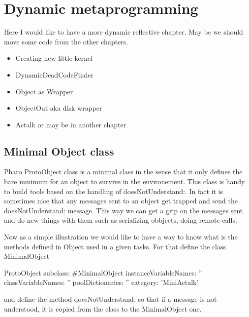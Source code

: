 \documentclass[a4paper,10pt,twoside]{book}
\begin{document}
	\sloppy
\fi
\chapter{Dynamic metaprogramming}\label{cha:metaprog}

Here I would like to have a more dynamic reflective chapter.
May be we should move some code from the other chapters.

	
\begin{itemize}
\item Creating new little kernel


\item DynamicDeadCodeFinder 

\item Object as Wrapper

\item ObjectOut aka disk wrapper

\item Actalk or may be in another chapter
\end{itemize}



\section{Minimal Object class}

Pharo ProtoObject class is a minimal class in the sense that it only defines the bare minimum for an object to survive in the environement. This class is handy to build tools based on the handling of doesNotUnderstand:.
In fact it is sometimes nice that any messages sent to an object get trapped and send the doesNotUnderstand: message.
This way we can get a grip on the messages sent and do new things with them such as serializing obbjects, doing remote calls.

Now as a simple illustration we would like to have a way to know what is the methods defined in Object used in a given tasks. 
For that define the class MinimalObject

\begin{classdef}{}
ProtoObject subclass: #MinimalObject
	instanceVariableNames: ''
	classVariableNames: ''
	poolDictionaries: ''
	category: 'MiniActalk'
\end{classdef}

and define the method doesNotUnderstand: so that if a message is not understood, it is copied from the class 
to the MinimalObject one. 
\end{document}
